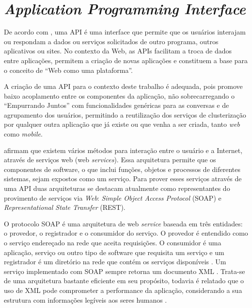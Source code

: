 \chapter{\textit{Application Programming Interface}} \label{cap:api}

De acordo com , uma API é uma interface que permite que os 
usuários interajam ou respondam a dados ou serviços solicitados de outro programa, outros
aplicativos ou sites. No contexto da Web, as APIs facilitam a troca de dados entre 
aplicações, permitem a criação de novas aplicações e constituem a base para o conceito de 
``Web como uma plataforma''.

A criação de uma API para o contexto deste trabalho é adequada, pois promove baixo acoplamento
entre os componentes da aplicação, não sobrecarregando o ``Empurrando Juntos'' com funcionalidades genéricas
para as conversas e de agrupamento dos usuários,
permitindo a reutilização dos serviços de clusterização por qualquer
outra aplicação que já existe ou que venha a ser criada, tanto \textit{web} como \textit{mobile}.


 afirmam que existem vários métodos para interação entre o  
usuário e a Internet, através de serviços web (web \textit{services}).
Essa arquitetura permite que os componentes de software, o que inclui funções,
objetos e processos de diferentes sistemas, sejam expostos como um serviço. Para prover esses serviços através de uma API duas arquiteturas se destacam atualmente como representantes do provimento
de serviços via \textit{Web}: \textit{Simple Object Access Protocol} (SOAP) e \textit{Representational State Transfer} (REST).

O protocolo SOAP é uma arquitetura de web \textit{service} baseada em três entidades: o provedor, o registrador e o consumidor do serviço.
O provedor é entendido como o serviço endereçado na rede
que aceita requisições. O consumidor é uma aplicação, serviço ou outro tipo de software que
requisita um serviço e um registrador é um diretório na rede que contém os serviços disponíveis \cite{mumbaikar}.
Um serviço implementado com SOAP sempre retorna um documento XML \cite{wagh2012comparative}. Trata-se de uma arquitetura 
bastante eficiente em seu propósito, 
todavia é relatado que o uso de XML pode comprometer a performance da aplicação, considerando a sua estrutura com informações 
legíveis aos seres humanos \cite{wagh2012comparative, soap_and_ws}.

